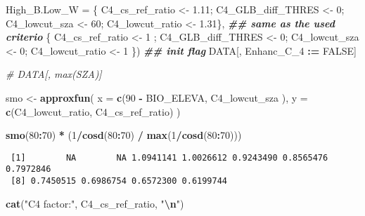 \documentclass[
  10pt,
  a4paper,oneside]{article}
\newenvironment{Shaded}{\begin{snugshade}}{\end{snugshade}}
\newcommand{\AttributeTok}[1]{\textcolor[rgb]{0.13,0.29,0.53}{#1}}
\newcommand{\CommentTok}[1]{\textcolor[rgb]{0.56,0.35,0.01}{\textit{#1}}}
\newcommand{\ConstantTok}[1]{\textcolor[rgb]{0.56,0.35,0.01}{#1}}
\newcommand{\DecValTok}[1]{\textcolor[rgb]{0.00,0.00,0.81}{#1}}
\newcommand{\DocumentationTok}[1]{\textcolor[rgb]{0.56,0.35,0.01}{\textbf{\textit{#1}}}}
\newcommand{\FloatTok}[1]{\textcolor[rgb]{0.00,0.00,0.81}{#1}}
\newcommand{\FunctionTok}[1]{\textcolor[rgb]{0.13,0.29,0.53}{\textbf{#1}}}
\newcommand{\NormalTok}[1]{#1}
\newcommand{\OtherTok}[1]{\textcolor[rgb]{0.56,0.35,0.01}{#1}}
\newcommand{\SpecialCharTok}[1]{\textcolor[rgb]{0.81,0.36,0.00}{\textbf{#1}}}
\newcommand{\StringTok}[1]{\textcolor[rgb]{0.31,0.60,0.02}{#1}}
\begin{document}
\begin{Shaded}
\begin{Highlighting}[]
       \AttributeTok{High\_B.Low\_W    =}\NormalTok{ \{ C4\_cs\_ref\_ratio }\OtherTok{\textless{}{-}} \FloatTok{1.11}\NormalTok{; C4\_GLB\_diff\_THRES }\OtherTok{\textless{}{-}}  \DecValTok{0}\NormalTok{; C4\_lowcut\_sza }\OtherTok{\textless{}{-}} \DecValTok{60}\NormalTok{; C4\_lowcut\_ratio }\OtherTok{\textless{}{-}} \FloatTok{1.31}\NormalTok{\}, }\DocumentationTok{\#\# same as the used criterio}
\NormalTok{                         \{ C4\_cs\_ref\_ratio }\OtherTok{\textless{}{-}} \DecValTok{1}\NormalTok{   ; C4\_GLB\_diff\_THRES }\OtherTok{\textless{}{-}}  \DecValTok{0}\NormalTok{; C4\_lowcut\_sza }\OtherTok{\textless{}{-}}  \DecValTok{0}\NormalTok{; C4\_lowcut\_ratio }\OtherTok{\textless{}{-}} \DecValTok{1}\NormalTok{   \})}
\DocumentationTok{\#\# init flag}
\NormalTok{DATA[, Enhanc\_C\_4 }\SpecialCharTok{:=} \ConstantTok{FALSE}\NormalTok{]}

\CommentTok{\# DATA[, max(SZA)]}

\NormalTok{smo }\OtherTok{\textless{}{-}} \FunctionTok{approxfun}\NormalTok{(}
    \AttributeTok{x =} \FunctionTok{c}\NormalTok{(}\DecValTok{90} \SpecialCharTok{{-}}\NormalTok{ BIO\_ELEVA, C4\_lowcut\_sza  ),}
    \AttributeTok{y =} \FunctionTok{c}\NormalTok{(C4\_lowcut\_ratio,  C4\_cs\_ref\_ratio)}
\NormalTok{    )}

\FunctionTok{smo}\NormalTok{(}\DecValTok{80}\SpecialCharTok{:}\DecValTok{70}\NormalTok{) }\SpecialCharTok{*}\NormalTok{ (}\DecValTok{1}\SpecialCharTok{/}\FunctionTok{cosd}\NormalTok{(}\DecValTok{80}\SpecialCharTok{:}\DecValTok{70}\NormalTok{) }\SpecialCharTok{/} \FunctionTok{max}\NormalTok{(}\DecValTok{1}\SpecialCharTok{/}\FunctionTok{cosd}\NormalTok{(}\DecValTok{80}\SpecialCharTok{:}\DecValTok{70}\NormalTok{)))}
\end{Highlighting}
\end{Shaded}

\begin{verbatim}
 [1]        NA        NA 1.0941141 1.0026612 0.9243490 0.8565476 0.7972846
 [8] 0.7450515 0.6986754 0.6572300 0.6199744
\end{verbatim}

\begin{Shaded}
\begin{Highlighting}[]
\FunctionTok{cat}\NormalTok{(}\StringTok{"C4 factor:"}\NormalTok{, C4\_cs\_ref\_ratio,   }\StringTok{"}\SpecialCharTok{\textbackslash{}n}\StringTok{"}\NormalTok{)}
\end{Highlighting}
\end{Shaded}
\end{document}
